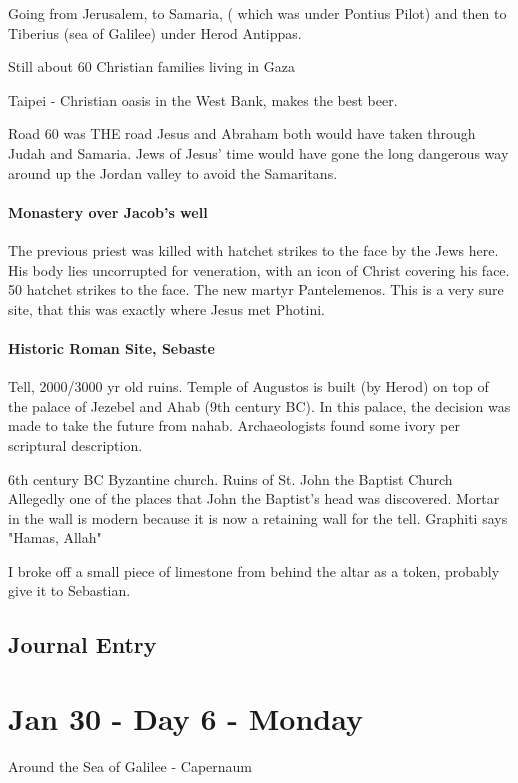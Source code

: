 \documentclass[letterpaper]{report}
\begin{document}
Going from Jerusalem, to Samaria, ( which was under Pontius Pilot) and then to Tiberius (sea of Galilee) under Herod Antippas.

Still about 60 Christian families living in Gaza

Taipei - Christian oasis in the West Bank, makes the best beer.

Road 60 was THE road Jesus and Abraham both would have taken through Judah and Samaria. Jews of Jesus' time would have gone the long dangerous way around up the Jordan valley to avoid the Samaritans.

\paragraph{Monastery over Jacob's well}
The previous priest was killed with hatchet strikes to the face by the Jews here. His body lies uncorrupted for veneration, with an icon of Christ covering his face.
50 hatchet strikes to the face.
The new martyr Pantelemenos.
This is a very sure site, that this was exactly where Jesus met Photini.

\paragraph{Historic Roman Site, Sebaste}
Tell, 2000/3000 yr old ruins. 
Temple of Augustos is built (by Herod) on top of the palace of Jezebel and Ahab (9th century BC). In this palace, the decision was made to take the future from nahab. Archaeologists found some ivory per scriptural description.

6th century BC Byzantine church.
Ruins of St. John the Baptist Church
Allegedly one of the places that John the Baptist's head was discovered. 
Mortar in the wall is modern because it is now a retaining wall for the tell.
Graphiti says "Hamas, Allah"

I broke off a small piece of limestone from behind the altar as a token,
probably give it to Sebastian.

\clearpage
\subsection{Journal Entry}


\clearpage
\section{Jan 30 - Day 6 - Monday}
Around the Sea of Galilee - Capernaum
\end{document}
